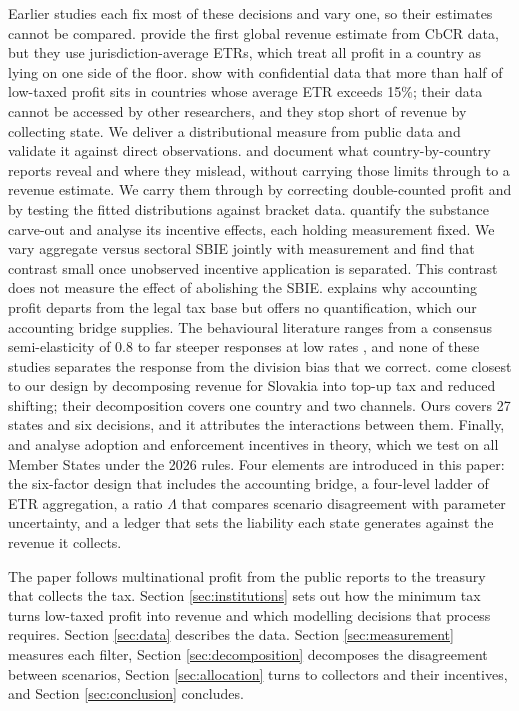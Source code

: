 \documentclass[11pt,a4paper]{article}
\begin{document}
Earlier studies each fix most of these decisions and vary one, so their estimates cannot be compared. \citet{barake2022} provide the first global revenue estimate from CbCR data, but they use jurisdiction-average ETRs, which treat all profit in a country as lying on one side of the floor. \citet{hugger2026} show with confidential data that more than half of low-taxed profit sits in countries whose average ETR exceeds 15\%; their data cannot be accessed by other researchers, and they stop short of revenue by collecting state. We deliver a distributional measure from public data and validate it against direct observations. \citet{godar2024} and \citet{tuinsma2025} document what country-by-country reports reveal and where they mislead, without carrying those limits through to a revenue estimate. We carry them through by correcting double-counted profit and by testing the fitted distributions against bracket data. \citet{devereux2023} quantify the substance carve-out and \citet{schjelderup2024} analyse its incentive effects, each holding measurement fixed. We vary aggregate versus sectoral SBIE jointly with measurement and find that contrast small once unobserved incentive application is separated. This contrast does not measure the effect of abolishing the SBIE. \citet{hanlon2023} explains why accounting profit departs from the legal tax base but offers no quantification, which our accounting bridge supplies. The behavioural literature ranges from a consensus semi-elasticity of 0.8 \citep{heckemeyer2017} to far steeper responses at low rates \citep{dowd2017,garcia-bernardo2024}, and none of these studies separates the response from the division bias that we correct. \citet{boukal2026} come closest to our design by decomposing revenue for Slovakia into top-up tax and reduced shifting; their decomposition covers one country and two channels. Ours covers 27 states and six decisions, and it attributes the interactions between them. Finally, \citet{devereux2022} and \citet{jean2026} analyse adoption and enforcement incentives in theory, which we test on all Member States under the 2026 rules. Four elements are introduced in this paper: the six-factor design that includes the accounting bridge, a four-level ladder of ETR aggregation, a ratio $\Lambda$ that compares scenario disagreement with parameter uncertainty, and a ledger that sets the liability each state generates against the revenue it collects.

The paper follows multinational profit from the public reports to the treasury that collects the tax. Section \ref{sec:institutions} sets out how the minimum tax turns low-taxed profit into revenue and which modelling decisions that process requires. Section \ref{sec:data} describes the data. Section \ref{sec:measurement} measures each filter, Section \ref{sec:decomposition} decomposes the disagreement between scenarios, Section \ref{sec:allocation} turns to collectors and their incentives, and Section \ref{sec:conclusion} concludes.
\end{document}

